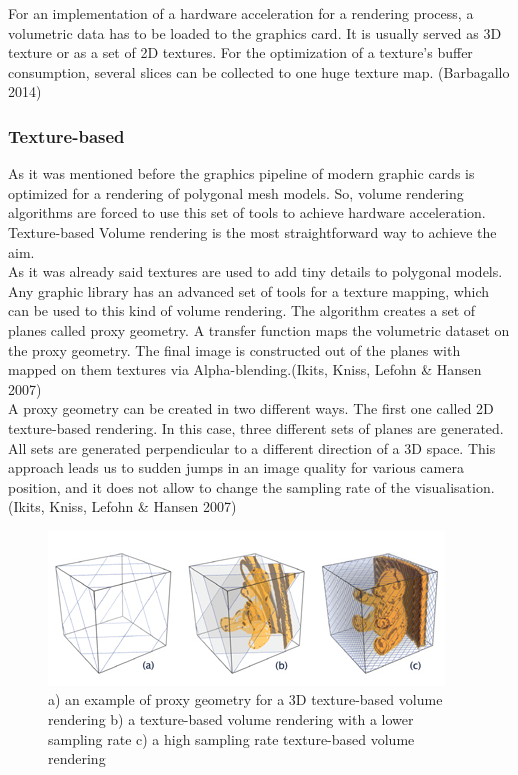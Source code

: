 \documentclass[twoside, english, 11pt]{report}
\begin{document}
For an implementation of a hardware acceleration for a rendering process, a volumetric data has to be loaded to the graphics card. It is usually served as 3D texture or as a set of 2D textures. For the optimization of a texture's buffer consumption, several slices can be collected to one huge texture map. (Barbagallo 2014) 

\subsubsection{Texture-based}

As it was mentioned before the graphics pipeline of modern graphic cards is optimized for a rendering of polygonal mesh models. So, volume rendering algorithms are forced to use this set of tools to achieve hardware acceleration. Texture-based Volume rendering is the most straightforward way to achieve the aim.\\

As it was already said textures are used to add tiny details to polygonal models. Any graphic library has an advanced set of tools for a texture mapping, which can be used to this kind of volume rendering. The algorithm creates a set of planes called proxy geometry. A transfer function maps the volumetric dataset on the proxy geometry. The final image is constructed out of the planes with mapped on them textures via Alpha-blending.(Ikits, Kniss, Lefohn \& Hansen 2007)\\

A proxy geometry can be created in two different ways. The first one called 2D texture-based rendering. In this case, three different sets of planes are generated. All sets are generated perpendicular to a different direction of a 3D space. This approach leads us to sudden jumps in an image quality for various camera position, and it does not allow to change the sampling rate of the visualisation.(Ikits, Kniss, Lefohn \& Hansen 2007)\\

\begin{figure}[!h]
\centerline{
\includegraphics[scale=0.75]{img/texture-based}
}
\caption{a) an example of proxy geometry for a 3D texture-based volume rendering b) a texture-based volume rendering with a lower sampling rate c) a high sampling rate texture-based volume rendering\label{fig:text}}
\end{figure}
\end{document}
